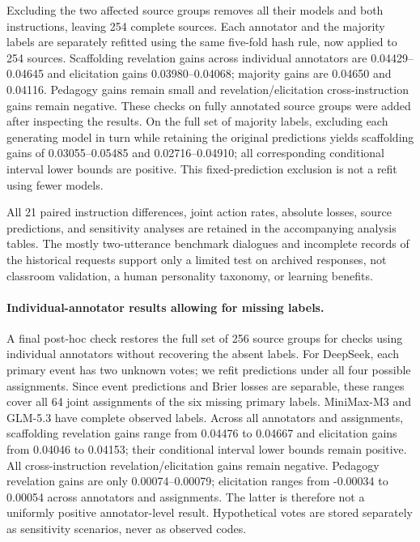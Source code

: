 Excluding the two affected source groups removes all their models and both
instructions, leaving 254 complete sources. Each annotator and the majority labels
are separately refitted using the same five-fold hash rule, now applied to
254 sources. Scaffolding revelation gains across individual annotators are
0.04429--0.04645 and elicitation gains 0.03980--0.04068; majority gains are
0.04650 and 0.04116. Pedagogy gains remain small and revelation/elicitation
cross-instruction gains remain negative. These checks on fully annotated source groups were added after inspecting the results. On the full set of majority labels, excluding each generating model in turn while
retaining the original predictions yields scaffolding gains of 0.03055--0.05485
and 0.02716--0.04910; all corresponding conditional interval lower bounds are
positive. This fixed-prediction exclusion is not a refit using fewer models.

All 21 paired instruction differences, joint action rates, absolute losses,
source predictions, and sensitivity analyses are retained in the accompanying
analysis tables. The mostly two-utterance benchmark dialogues and incomplete records of the
historical requests support only a limited test on archived responses,
not classroom validation, a human personality taxonomy, or learning benefits.

\paragraph{Individual-annotator results allowing for missing labels.}
A final post-hoc check restores the full set of 256 source groups for checks using individual annotators without recovering the absent labels. For DeepSeek, each
primary event has two unknown votes; we refit predictions under all four possible
assignments. Since event predictions and Brier losses are separable, these
ranges cover all 64 joint assignments of the six missing primary labels.
MiniMax-M3 and GLM-5.3 have complete observed labels. Across all annotators and
assignments, scaffolding revelation gains range from 0.04476 to 0.04667 and
elicitation gains from 0.04046 to 0.04153; their conditional interval lower
bounds remain positive. All cross-instruction revelation/elicitation gains
remain negative. Pedagogy revelation gains are only 0.00074--0.00079; elicitation
ranges from -0.00034 to 0.00054 across annotators and assignments. The latter is
therefore not a uniformly positive annotator-level result. Hypothetical votes are
stored separately as sensitivity scenarios, never as observed codes.
